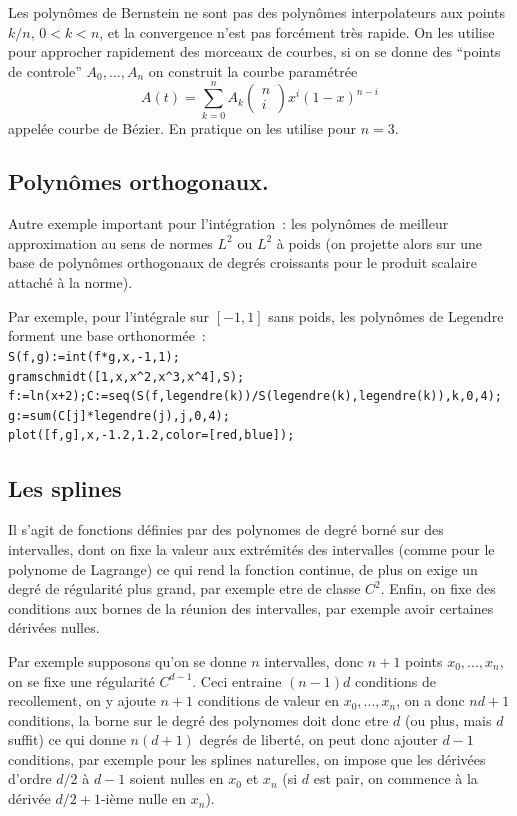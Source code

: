 \documentclass[a4paper,11pt]{article}
\begin{document}
Les polyn\^omes de Bernstein ne sont pas des polyn\^omes
interpolateurs aux points $k/n, \, 0<k<n$, et la convergence
n'est pas forc\'ement tr\`es rapide.
On les utilise pour approcher rapidement des morceaux de
courbes, si on se donne des ``points de controle'' $A_0, ..., A_n$
on construit la courbe param\'etr\'ee
$$ A(t) = \sum_{k=0}^n A_k \left( \begin{array}{c} n\\ i \end{array} \right) x^i
(1-x)^{n-i} $$
appel\'ee courbe de B\'ezier. En pratique on les utilise pour $n=3$.

\subsection{Polynômes orthogonaux.}
Autre exemple important pour l'int\'egration~: les polyn\^omes
de meilleur approximation au sens de normes $L^2$ ou $L^2$
\`a poids (on projette alors sur une base de polyn\^omes orthogonaux
de degr\'es croissants pour le produit scalaire attach\'e \`a la
norme).

Par exemple, pour l'int\'egrale sur $[-1,1]$ sans poids, 
les polyn\^omes de Legendre forment une base orthonorm\'ee~:\\
\verb|S(f,g):=int(f*g,x,-1,1);|\\
\verb|gramschmidt([1,x,x^2,x^3,x^4],S);|\\
\verb|f:=ln(x+2);C:=seq(S(f,legendre(k))/S(legendre(k),legendre(k)),k,0,4);|\\
\verb|g:=sum(C[j]*legendre(j),j,0,4);|\\
\verb|plot([f,g],x,-1.2,1.2,color=[red,blue]);|

\subsection{Les splines}
Il s'agit de fonctions définies par des polynomes de degré borné
sur des intervalles, dont on fixe la valeur
aux extrémités des intervalles (comme pour le polynome de Lagrange)
ce qui rend la fonction continue, de plus on exige un
degré de régularité plus grand, par exemple etre de classe $C^2$.
Enfin, on fixe des conditions aux bornes de la réunion des 
intervalles, par exemple avoir certaines dérivées nulles. 

Par exemple supposons qu'on se donne $n$ intervalles, donc $n+1$
points $x_0,...,x_n$, on se fixe une régularité $C^{d-1}$. Ceci
entraine $(n-1)d$ conditions de recollement, on y ajoute $n+1$
conditions de valeur en $x_0,...,x_n$, on a donc $nd+1$ conditions,
la borne sur le degré des polynomes doit donc etre $d$ (ou plus,
mais $d$ suffit) ce qui donne $n(d+1)$ degrés de liberté, on
peut donc ajouter $d-1$ conditions, par exemple pour les splines
naturelles, on impose que les dérivées d'ordre $d/2$ à $d-1$
soient nulles en $x_0$ et $x_n$ (si $d$ est pair, on commence à
la dérivée $d/2+1$-ième nulle en $x_n$).
\end{document}
